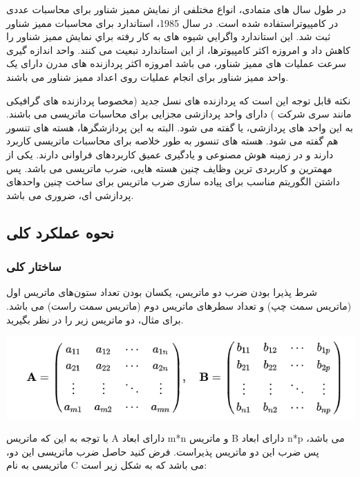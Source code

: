 \documentclass[12pt,titlepage,a4page , tikz , multi,table , svgnames,xcdraw]{article}
\begin{document}
در طول سال های متمادی، انواع مختلفی از نمایش ممیز شناور برای محاسبات عددی در کامپیوتراستفاده شده است. در سال 1985، استاندارد 
 برای محاسبات ممیز شناور ثبت شد.  اين استاندارد واگرايي شيوه های به كار رفته براي نمايش مميز شناور را كاهش داد و امروزه اکثر کامپیوترها، از این استاندارد تبعیت می کنند. واحد اندازه گیری سرعت عملیات های ممیز شناور، 
می باشد امروزه اکثر پردازنده های مدرن دارای یک واحد ممیز شناور برای انجام عملیات روی اعداد ممیز شناور می باشند. \cite{wikipediaFP}

نکته قابل توجه این است که پردازنده های نسل جدید (مخصوصا پردازنده های گرافیکی مانند سری 
 شرکت 
) دارای واحد پردازشی مجزایی برای محاسبات ماتریسی می باشند. به این واحد های پردازشی، 
 یا 
گفته می شود. البته به این پردازشگرها، هسته های تنسور 
 هم گفته می شود. هسته های تنسور به طور خلاصه برای محاسبات ماتریسی کاربرد دارند و در زمینه هوش مصنوعی و یادگیری عمیق کاربردهای فراوانی دارند. یکی از مهمترین و کاربردی ترین وظایف چنین هسته هایی، ضرب ماتریسی می باشد. پس داشتن الگوریتم مناسب برای پیاده سازی ضرب ماتریس برای ساخت چنین واحدهای پردازشی ای، ضروری می باشد. \cite{wikipediaTPU} \cite{Tensor}



\subsection{نحوه عملکرد کلی}
\subsubsection{ساختار کلی}
	
    شرط پذیرا بودن ضرب دو ماتریس، یکسان بودن تعداد ستون‌های ماتریس اول (ماتریس سمت چپ) و تعداد سطرهای ماتریس دوم (ماتریس سمت راست) می باشد. برای مثال، دو ماتریس زیر را در نظر بگیرید. 

\begin{center}
\includegraphics[scale=0.8]
    {Images/Introduction/mat_mult_1.png}\\
\end{center}

با توجه به این که ماتریس A دارای ابعاد m*n و ماتریس B دارای ابعاد n*p می باشد، پس ضرب این دو ماتریس پذیراست. فرض کنید حاصل ضرب ماتریسی این دو، ماتریسی به نام C می باشد که به شکل زیر است:
	
\end{document}
